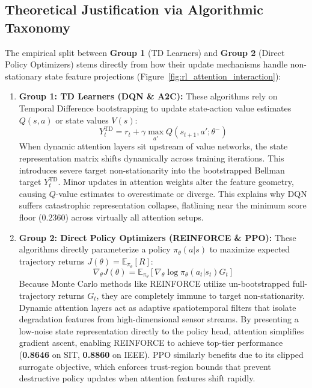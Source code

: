 \documentclass[sn-basic]{sn-jnl}%
\begin{document}
\subsection{Theoretical Justification via Algorithmic Taxonomy}
The empirical split between \textbf{Group 1} (TD Learners) and \textbf{Group 2} (Direct Policy Optimizers) stems directly from how their update mechanisms handle non-stationary state feature projections (Figure~\ref{fig:rl_attention_interaction}):

\begin{enumerate}
    \item \textbf{Group 1: TD Learners (\textsc{DQN} \& \textsc{A2C}):} These algorithms rely on Temporal Difference bootstrapping to update state-action value estimates $Q(s,a)$ or state values $V(s)$:
    \begin{equation}
        Y_t^{\text{TD}} = r_t + \gamma \max_{a'} Q(s_{t+1}, a'; \theta^-)
    \end{equation}
    When dynamic attention layers sit upstream of value networks, the state representation matrix shifts dynamically across training iterations. This introduces severe target non-stationarity into the bootstrapped Bellman target $Y_t^{\text{TD}}$. Minor updates in attention weights alter the feature geometry, causing $Q$-value estimates to overestimate or diverge. This explains why \textsc{DQN} suffers catastrophic representation collapse, flatlining near the minimum score floor ($0.2360$) across virtually all attention setups.
    
    \item \textbf{Group 2: Direct Policy Optimizers (\textsc{REINFORCE} \& \textsc{PPO}):} These algorithms directly parameterize a policy $\pi_\theta(a|s)$ to maximize expected trajectory returns $J(\theta) = \mathbb{E}_{\pi_\theta}[R]$:
    \begin{equation}
        \nabla_\theta J(\theta) = \mathbb{E}_{\pi_\theta} \left[ \nabla_\theta \log \pi_\theta(a_t|s_t) G_t \right]
    \end{equation}
    Because Monte Carlo methods like \textsc{REINFORCE} utilize un-bootstrapped full-trajectory returns $G_t$, they are completely immune to target non-stationarity. Dynamic attention layers act as adaptive spatiotemporal filters that isolate degradation features from high-dimensional sensor streams. By presenting a low-noise state representation directly to the policy head, attention simplifies gradient ascent, enabling \textsc{REINFORCE} to achieve top-tier performance (\textbf{0.8646} on SIT, \textbf{0.8860} on IEEE). \textsc{PPO} similarly benefits due to its clipped surrogate objective, which enforces trust-region bounds that prevent destructive policy updates when attention features shift rapidly.
\end{enumerate}
\end{document}
